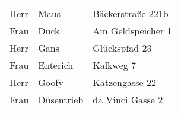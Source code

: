 \documentclass[12pt,ngerman]{scrartcl}
\begin{document}
\begin{tabular}{lll}
	    Herr & Maus &Bäckerstraße 221b \\
	    Frau & Duck &Am Geldspeicher 1 \\
	    Herr & Gans &Glückspfad 23 \\
	    Frau & Enterich &Kalkweg 7 \\
	    Herr & Goofy &Katzengasse 22 \\
	    Frau & Düsentrieb &da Vinci Gasse 2 \\
	\end{tabular}
\end{document}
